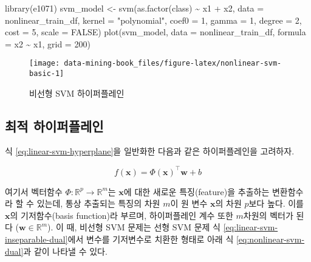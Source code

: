 \documentclass[
]{book}
\newenvironment{Shaded}{\begin{snugshade}}{\end{snugshade}}
\newcommand{\AttributeTok}[1]{\textcolor[rgb]{0.77,0.63,0.00}{#1}}
\newcommand{\ConstantTok}[1]{\textcolor[rgb]{0.00,0.00,0.00}{#1}}
\newcommand{\DecValTok}[1]{\textcolor[rgb]{0.00,0.00,0.81}{#1}}
\newcommand{\FunctionTok}[1]{\textcolor[rgb]{0.00,0.00,0.00}{#1}}
\newcommand{\NormalTok}[1]{#1}
\newcommand{\OtherTok}[1]{\textcolor[rgb]{0.56,0.35,0.01}{#1}}
\newcommand{\SpecialCharTok}[1]{\textcolor[rgb]{0.00,0.00,0.00}{#1}}
\newcommand{\StringTok}[1]{\textcolor[rgb]{0.31,0.60,0.02}{#1}}
\begin{document}
\begin{Shaded}
\begin{Highlighting}[]
\FunctionTok{library}\NormalTok{(e1071)}
\NormalTok{svm\_model }\OtherTok{\textless{}{-}} \FunctionTok{svm}\NormalTok{(}\FunctionTok{as.factor}\NormalTok{(class) }\SpecialCharTok{\textasciitilde{}}\NormalTok{ x1 }\SpecialCharTok{+}\NormalTok{ x2, }\AttributeTok{data =}\NormalTok{ nonlinear\_train\_df, }
                 \AttributeTok{kernel =} \StringTok{"polynomial"}\NormalTok{, }\AttributeTok{coef0 =} \DecValTok{1}\NormalTok{, }\AttributeTok{gamma =} \DecValTok{1}\NormalTok{, }\AttributeTok{degree =} \DecValTok{2}\NormalTok{,}
                 \AttributeTok{cost =} \DecValTok{5}\NormalTok{, }\AttributeTok{scale =} \ConstantTok{FALSE}\NormalTok{)}
\FunctionTok{plot}\NormalTok{(svm\_model, }\AttributeTok{data =}\NormalTok{ nonlinear\_train\_df, }\AttributeTok{formula =}\NormalTok{ x2 }\SpecialCharTok{\textasciitilde{}}\NormalTok{ x1, }\AttributeTok{grid =} \DecValTok{200}\NormalTok{)}
\end{Highlighting}
\end{Shaded}

\begin{figure}

{\centering \texttt{[image: data-mining-book\_files/figure-latex/nonlinear-svm-basic-1]} 

}

\caption{비선형 SVM 하이퍼플레인}\label{fig:nonlinear-svm-basic}
\end{figure}

\hypertarget{nonlinear-svm-hyperplane}{%
\subsection{최적 하이퍼플레인}\label{nonlinear-svm-hyperplane}}

식 \eqref{eq:linear-svm-hyperplane}을 일반화한 다음과 같은 하이퍼플레인을 고려하자.

\begin{equation}
f(\mathbf{x}) = \Phi(\mathbf{x})^\top \mathbf{w} + b \label{eq:nonlinear-svm-hyperplane}
\end{equation}

여기서 벡터함수 \(\Phi: \mathbb{R}^p \rightarrow \mathbb{R}^m\)는 \(\mathbf{x}\)에 대한 새로운 특징(feature)을 추출하는 변환함수라 할 수 있는데, 통상 추출되는 특징의 차원 \(m\)이 원 변수 \(\mathbf{x}\)의 차원 \(p\)보다 높다. 이를 \(\mathbf{x}\)의 기저함수(basis function)라 부르며, 하이퍼플레인 계수 또한 \(m\)차원의 벡터가 된다 (\(\mathbf{w} \in \mathbb{R}^m\)). 이 때, 비선형 SVM 문제는 선형 SVM 문제 식 \eqref{eq:linear-svm-inseparable-dual}에서 변수를 기저변수로 치환한 형태로 아래 식 \eqref{eq:nonlinear-svm-dual}과 같이 나타낼 수 있다.
\end{document}
